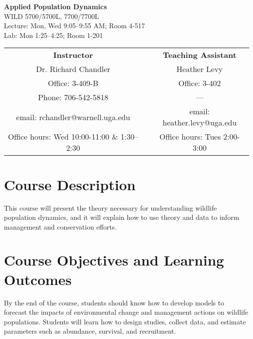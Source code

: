 \documentclass[11pt]{article}
\begin{document}
\begin{center}

{%
  \huge \bf \sc
  Applied Population Dynamics \\}
{\large
  WILD 5700/5700L, 7700/7700L  \\
  Lecture: Mon, Wed 9:05--9:55 AM; Room 4-517 \\
  Lab: Mon 1:25--4:25; Room 1-201
}

\large

\vspace{0.5cm}

\begin{tabular}[h!]{ccc}
\textbf{Instructor}                 & \hspace{1.5cm} & \textbf{Teaching Assistant} \\
Dr. Richard Chandler                & & Heather Levy \\
Office: 3-409-B                     & & Office: 3-402  \\
Phone: 706-542-5818                 & & --- \\
email: rchandler@warnell.uga.edu    & & email: heather.levy@uga.edu \\
Office hours: Wed 10:00-11:00 \& 1:30--2:30  & & Office hours: Tues 2:00-3:00 \\
\end{tabular}
\end{center}


\normalsize


\vspace{-3mm}
\section*{Course Description}
\vspace{-2mm}
This course will present the theory necessary for understanding
wildlife population dynamics, and it will explain how to use theory
and data to inform management and conservation efforts.

\vspace{-5mm}
\section*{Course Objectives and Learning Outcomes}
\vspace{-2mm}
By the end of the course, students should know how to develop models
to forecast the impacts of environmental change and management actions
on wildlife populations. Students will learn how to design studies,
collect data, and estimate parameters such as abundance,
survival, and recruitment.
\end{document}
